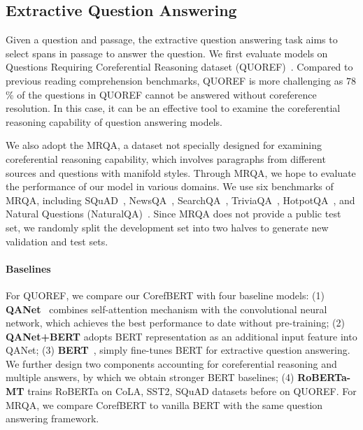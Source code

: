 \documentclass[11pt,a4paper]{article}
\begin{document}
\subsection{Extractive Question Answering}


Given a question and passage, the extractive question answering task aims to select spans in passage to answer the question. We first evaluate models on  Questions Requiring Coreferential Reasoning dataset (QUOREF)~\citep{QUOREF}.
Compared to previous reading comprehension benchmarks, QUOREF is more challenging as $78$\% of the questions in QUOREF cannot be answered without coreference resolution. In  this case, it can be an effective tool to examine the coreferential reasoning capability of question answering models. 


We also adopt the MRQA, a dataset not specially designed for examining  coreferential reasoning capability, which involves paragraphs from different sources and questions with manifold styles. Through MRQA, we hope to evaluate the performance of our model in various domains.
We use six benchmarks of MRQA, including SQuAD~\citep{rajpurkar2016squad}, NewsQA~\citep{newsqa}, SearchQA~\citep{searchqa}, TriviaQA~\citep{triviaqa}, HotpotQA~\citep{hotpotqa}, and Natural Questions (NaturalQA)~\citep{naturalqa}. Since MRQA does not provide a public test set, we randomly split the development set into two halves to generate new validation and test sets.



\vspace{-0.1em}
\paragraph{Baselines} For QUOREF, we compare our CorefBERT  with four baseline models: (1) \textbf{QANet}~\citep{QANET} combines self-attention mechanism with the convolutional neural network, which achieves the best performance to date without pre-training; (2) \textbf{QANet+BERT} adopts BERT representation as an additional input feature into QANet; (3) \textbf{BERT}~\citep{BERT}, simply fine-tunes BERT for extractive question answering.   We further design two components accounting for coreferential reasoning and multiple answers, by which we obtain stronger BERT baselines;
(4) \textbf{RoBERTa-MT}  trains RoBERTa on CoLA, SST2, SQuAD datasets before on QUOREF. For MRQA, we compare CorefBERT to vanilla BERT with the same question answering framework.
\end{document}

